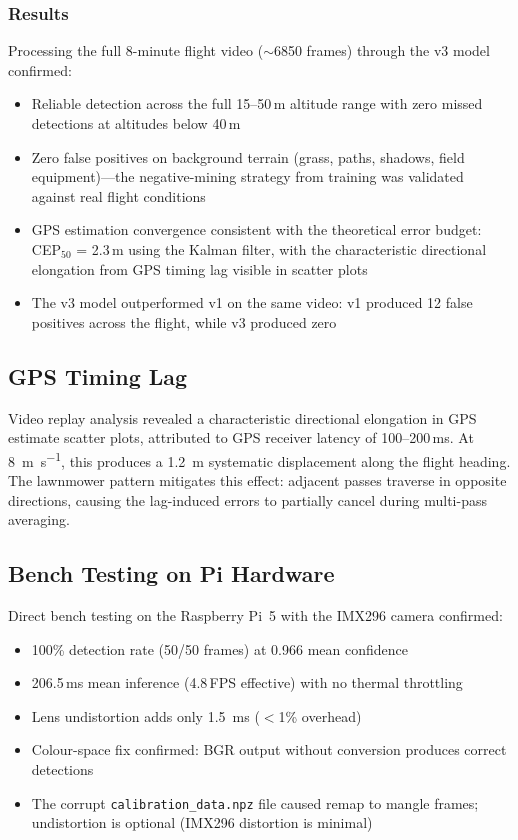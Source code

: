 \documentclass[10pt,a4paper]{article}
\begin{document}
\subsubsection{Results}

Processing the full 8-minute flight video (${\sim}$6850 frames) through the v3 model confirmed:
\begin{itemize}
    \item Reliable detection across the full 15--50\,m altitude range with zero missed detections at altitudes below 40\,m
    \item Zero false positives on background terrain (grass, paths, shadows, field equipment)---the negative-mining strategy from training was validated against real flight conditions
    \item GPS estimation convergence consistent with the theoretical error budget: CEP$_{50}$ = 2.3\,m using the Kalman filter, with the characteristic directional elongation from GPS timing lag visible in scatter plots
    \item The v3 model outperformed v1 on the same video: v1 produced 12 false positives across the flight, while v3 produced zero
\end{itemize}

\subsection{GPS Timing Lag}

Video replay analysis revealed a characteristic directional elongation in GPS estimate scatter plots, attributed to GPS receiver latency of 100--200\,ms. At \SI{8}{\metre\per\second}, this produces a \SI{1.2}{\metre} systematic displacement along the flight heading. The lawnmower pattern mitigates this effect: adjacent passes traverse in opposite directions, causing the lag-induced errors to partially cancel during multi-pass averaging.

\subsection{Bench Testing on Pi Hardware}

Direct bench testing on the Raspberry Pi~5 with the IMX296 camera confirmed:
\begin{itemize}
    \item 100\% detection rate (50/50 frames) at 0.966 mean confidence
    \item 206.5\,ms mean inference (4.8\,FPS effective) with no thermal throttling
    \item Lens undistortion adds only \SI{1.5}{\milli\second} ($<$1\% overhead)
    \item Colour-space fix confirmed: BGR output without conversion produces correct detections
    \item The corrupt \texttt{calibration\_data.npz} file caused remap to mangle frames; undistortion is optional (IMX296 distortion is minimal)
\end{itemize}
\end{document}
